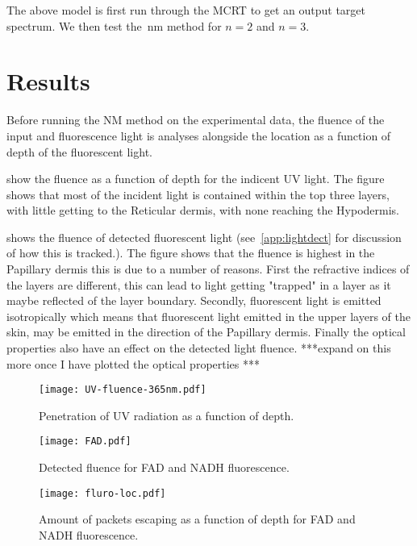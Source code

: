 The above model is first run through the MCRT to get an output target spectrum.
We then test the~\gls*{nm} method for $n=2$ and $n=3$.


\section{Results}

Before running the NM method on the experimental data, the fluence of the input and fluorescence light is analyses alongside the location as a function of depth of the fluorescent light.

 show the fluence as a function of depth for the indicent UV light.
The figure shows that most of the incident light is contained within the top three layers, with little getting to the Reticular dermis, with none reaching the Hypodermis.

 shows the fluence of detected fluorescent light (see~\cref{app:lightdect} for discussion of how this is tracked.).
The figure shows that the fluence is highest in the Papillary dermis this is due to a number of reasons.
First the refractive indices of the layers are different, this can lead to light getting "trapped" in a layer as it maybe reflected of the layer boundary.
Secondly, fluorescent light is emitted isotropically which means that fluorescent light emitted in the upper layers of the skin, may be emitted in the direction of the Papillary dermis.
Finally the optical properties also have an effect on the detected light fluence.
***expand on this more once I have plotted the optical properties ***

\begin{figure}[!htpb]
    \centering
    \texttt{[image: UV-fluence-365nm.pdf]}
    \caption{Penetration of UV radiation as a function of depth.}
    \label{fig:uvpen}
\end{figure}

\begin{figure}[!htpb]
    \centering
    \texttt{[image: FAD.pdf]}
    \caption{Detected fluence for FAD and NADH fluorescence.}
    \label{fig:fadnadhboth}
\end{figure}

\begin{figure}[!htpb]
    \centering
    \texttt{[image: fluro-loc.pdf]}
    \caption{Amount of packets escaping as a function of depth for FAD and NADH fluorescence.}
    \label{fig:floc}
\end{figure}

